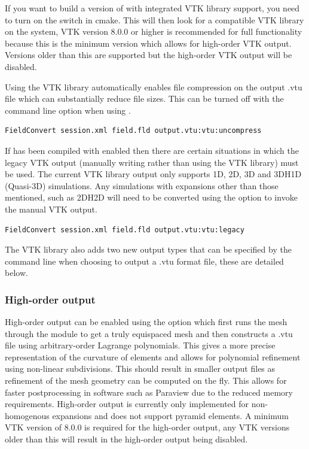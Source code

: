 If you want to build a version of \nekpp with integrated VTK library support, you
need  to turn on the  switch in cmake. This will then
look  for a compatible VTK library on the system, VTK version 8.0.0 or higher is
recommended for full functionality because this is the minimum version which allows
for high-order VTK output. Versions older than this are supported but the high-order
VTK output will be disabled.

Using the VTK library automatically enables file compression on the output .vtu file
which can substantially reduce file sizes. This can be turned off with the
command line option  when using .

\begin{lstlisting}[style=BashInputStyle]
FieldConvert session.xml field.fld output.vtu:vtu:uncompress
\end{lstlisting}

If \nekpp has been compiled with  enabled then there are certain
situations in which the legacy VTK output (manually writing rather than using the
VTK library) must be used. The current VTK library output only supports 1D, 2D, 3D and
3DH1D (Quasi-3D) simulations. Any simulations with expansions other than those mentioned,
such as 2DH2D will need to be converted using the  option to invoke the
manual \nekpp VTK output.

\begin{lstlisting}[style=BashInputStyle]
FieldConvert session.xml field.fld output.vtu:vtu:legacy
\end{lstlisting}

The VTK library also adds two new output types that can be specified by the command
line when choosing to output a .vtu format file, these are detailed below.

\subsubsection{High-order output}
High-order output can be enabled using the option  which first
runs the mesh through the  module to get a truly
equispaced mesh and then constructs a .vtu file using arbitrary-order Lagrange
polynomials. This gives a more precise representation of the curvature of
elements and allows for polynomial refinement using non-linear subdivisions. This
should result in smaller output files as refinement of the mesh geometry can be
computed on the fly. This allows for faster postprocessing in software such as
Paraview due to the reduced memory requirements. High-order output is currently only
implemented for non-homogenous expansions and does not support pyramid elements.
A minimum VTK version of 8.0.0 is required for the high-order output, any VTK versions
older than this will result in the high-order output being disabled.

